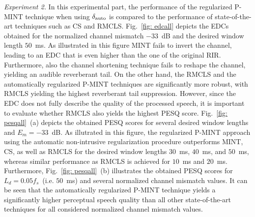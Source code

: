 \documentclass{article}
\begin{document}
\smallskip \noindent \textit{Experiment 2.} \enspace
In this experimental part, the performance of the regularized P-MINT technique when using $\delta_{\rm auto}$ is compared to the performance of state-of-the-art techniques such as CS and RMCLS.
Fig.~\ref{fig: edcall} depicts the EDCs obtained for the normalized channel mismatch $-33$~dB and the desired window length $50$~ms. 
As illustrated in this figure MINT fails to invert the channel, leading to an EDC that is even higher than the one of the original RIR. 
Furthermore, also the channel shortening technique fails to reshape the channel, yielding an audible reverberant tail.
On the other hand, the RMCLS and the automatically regularized P-MINT techniques are significantly more robust, with RMCLS yielding the highest reverberant tail suppression.
However, since the EDC does not fully describe the quality of the processed speech, it is important to evaluate whether RMCLS also yields the highest PESQ score.
Fig.~\ref{fig: pesqall}~(a) depicts the obtained PESQ scores for several desired window lengths and $E_m = -33$~dB.
As illutrated in this figure, the regularized P-MINT approach using the automatic non-intrusive regularization procedure outperforms MINT, CS, as well as RMCLS for the desired window lengths $30$~ms, $40$~ms, and $50$~ms, whereas similar performance as RMCLS is achieved for $10$~ms and $20$~ms.
Furthermore, Fig.~\ref{fig: pesqall}~(b) illustrates the obtained PESQ scores for $L_d = 0.05 f_s$~(i.e. $50$~ms) and several normalized channel mismatch values.
It can be seen that the automatically regularized P-MINT technique yields a significantly higher perceptual speech quality than all other state-of-the-art techniques for all considered normalized channel mismatch values. 
\end{document}
